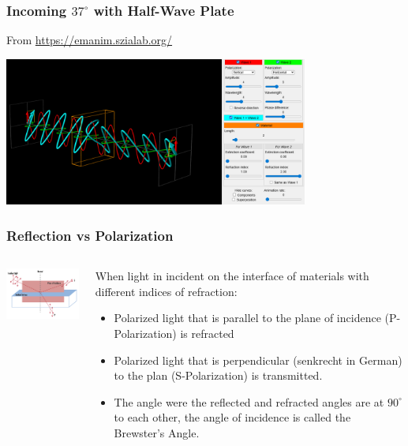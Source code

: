 \documentclass{beamer}
\begin{document}
\begin{frame}\frametitle{Incoming $37^\circ$ with Half-Wave Plate}
From \url{https://emanim.szialab.org/}

\begin{center}
\includegraphics[width=10cm]{fig/waveplate_37_2.png}
\end{center}
\end{frame}

\begin{frame}\frametitle{Reflection vs Polarization}
\begin{columns}
\begin{column}{5cm}
\begin{center}
\includegraphics[width=5cm]{fig/svsp.png}
\end{center}
\end{column}
\begin{column}{6cm}
When light in incident on the interface of materials with different indices of refraction: 
\begin{itemize}
\item Polarized light that is parallel to the plane of incidence (P-Polarization) is refracted
\item Polarized light that is perpendicular (senkrecht in German) to the plan (S-Polarization) is transmitted.
\item The angle were the reflected and refracted angles are at $90^{\circ}$ to each other, the angle of incidence is called the Brewster's Angle.
\end{itemize}
\end{column}
\end{columns}
\end{frame}
\end{document}
